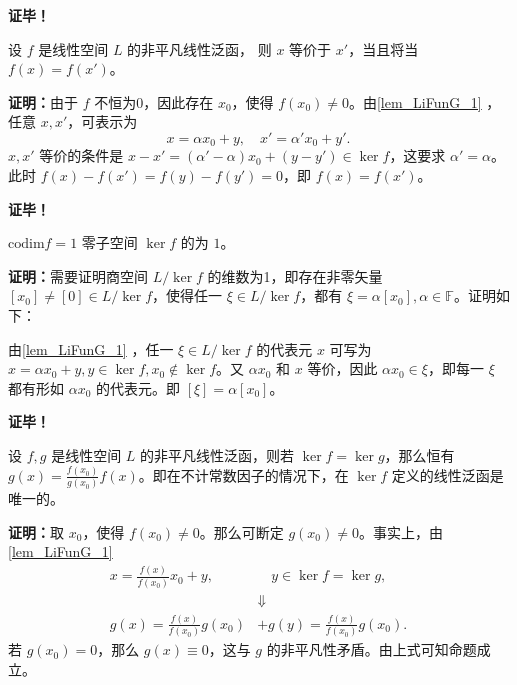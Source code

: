\textbf{证毕！}

\begin{corollary}{}
设 $f$ 是线性空间 $L$ 的非平凡线性泛函， 则 $x$ 等价于 $x'$，当且将当 $f(x)=f(x')$。
\end{corollary}
\textbf{证明：}由于 $f$ 不恒为0，因此存在 $x_0$，使得 $f(x_0)\neq0$。由\autoref{lem_LiFunG_1} ，任意 $x,x'$，可表示为
\begin{equation}
x=\alpha x_0+y,\quad x'=\alpha' x_0+y'.~
\end{equation}
$x,x'$ 等价的条件是 $x-x'=(\alpha'-\alpha)x_0+(y-y')\in \ker f$，这要求 $\alpha'=\alpha$。此时 $f(x)-f(x')=f(y)-f(y')=0$，即 $f(x)=f(x')$。

\textbf{证毕！}


\begin{corollary}{ $\mathrm{codim} f=1$ }
零子空间 $\ker f$ 的为 $1$。
\end{corollary}

\textbf{证明：}需要证明商空间 $L/\ker f$ 的维数为1，即存在非零矢量 $[x_0]\neq [0]\in L/\ker f$，使得任一 $\xi\in L/\ker f$，都有 $\xi=\alpha[x_0],\alpha\in\mathbb F$。证明如下：

由\autoref{lem_LiFunG_1} ，任一 $\xi\in L/\ker f$ 的代表元 $x$ 可写为 $x=\alpha x_0+y,y\in\ker f,x_0\notin\ker f$。又 $\alpha x_0$ 和 $x$ 等价，因此 $\alpha x_0\in \xi$，即每一 $\xi$ 都有形如 $\alpha x_0$ 的代表元。即 $[\xi]=\alpha[x_0]$。 

\textbf{证毕！}







\begin{corollary}{}
设 $f,g$ 是线性空间 $L$ 的非平凡线性泛函，则若 $\ker f=\ker g$，那么恒有 $g(x)=\frac{f(x_0)}{g(x_0)}f(x)$。即在不计常数因子的情况下，在 $\ker f$ 定义的线性泛函是唯一的。 
\end{corollary}
\textbf{证明：}取 $x_0$，使得 $f(x_0)\neq0$。那么可断定 $g(x_0)\neq0$。事实上，由\autoref{lem_LiFunG_1} 
\begin{equation}
\begin{aligned}
x=\frac{f(x)}{f(x_0)}x_0+y,&\quad y\in\ker f=\ker g,\\
&\Downarrow\\
g(x)=\frac{f(x)}{f(x_0)}g(x_0)&+g(y)=\frac{f(x)}{f(x_0)}g(x_0).
\end{aligned}~
\end{equation}
若 $g(x_0)=0$，那么 $g(x)\equiv0$，这与 $g$ 的非平凡性矛盾。由上式可知命题成立。

